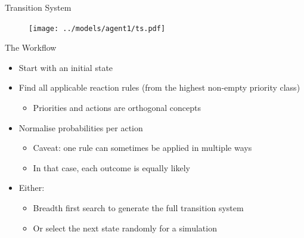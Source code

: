 \documentclass{beamer}
\begin{document}
\begin{frame}{Transition System}
  \begin{figure}
    \centering
    \texttt{[image: ../models/agent1/ts.pdf]}
  \end{figure}
\end{frame}

\begin{frame}{The Workflow}
  \begin{itemize}
  \item Start with an initial state
    \pause
  \item Find all applicable reaction rules (from the highest non-empty priority
    class)
    \begin{itemize}
    \item Priorities and actions are orthogonal concepts
    \end{itemize}
    \pause
  \item Normalise probabilities per action
    \pause
    \begin{itemize}
    \item Caveat: one rule can sometimes be applied in multiple ways
    \item In that case, each outcome is equally likely
    \end{itemize}
    \pause
  \item Either:
    \begin{itemize}
    \item Breadth first search to generate the full transition system
    \item Or select the next state randomly for a simulation
    \end{itemize}
  \end{itemize}
\end{frame}
\end{document}
